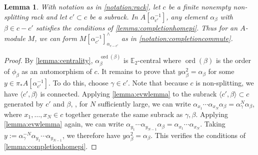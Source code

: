 \documentclass[12 pt]{amsart}
\theoremstyle{plain}
\newtheorem{lemma}[theorem]{Lemma}
\theoremstyle{definition}
\theoremstyle{remark}
\numberwithin{equation}{section}
\newcommand\EE{\mathbb{E}}
\DeclareMathOperator\ord{ord}
\begin{document}
\begin{lemma}\label{lemma:completionhomepihur}
	With notation as in \autoref{notation:rack}, let $c$ be a finite nonempty
	non-splitting rack
	and let $c' \subset c$ be a subrack. In
	$A[\alpha_{c'}^{-1}]$, any element $\alpha_{\beta}$ with $\beta \in c-c'$ satisfies the conditions of \autoref{lemma:completionhomepi}. 
	Thus for an $A$-module $M$, we can form
	$M[\alpha_{c'}^{-1}]^{\wedge}_{\alpha_{c-c'}}$ as in \autoref{notation:completioncommute}.
\end{lemma}
\begin{proof}
	By \autoref{lemma:centrality}, $\alpha_{\beta}^{\ord(\beta)}$ is $\EE_2$-central where $\ord(\beta)$ is the order of $\phi_{\beta}$ as an automorphism of $c$. It remains to prove that
	$y\alpha_{\beta}^2=\alpha_{\beta}$ for some $y \in \pi_*A[\alpha_{c'}^{-1}]$.
	To do this, choose $\gamma\in c'$. 
	Note that because $c$ is non-splitting, we have $\langle c', \beta
	\rangle$ is connected.
	Applying \autoref{lemma:evwlemma} to the subrack
	$\langle c', \beta \rangle \subset c$ generated by $c'$ and $\beta$,
	, %
	for $N$
	sufficiently large, 
	we can write $
\alpha_{x_1}
	\cdots \alpha_{x_N}\alpha_{\beta} =
	\alpha_\gamma^N\alpha_\beta$,
	where $x_1, \ldots, x_N \in c$ together generate the same
	subrack as $\gamma, \beta$.
	Applying \autoref{lemma:evwlemma} 
again, we can write
	$\alpha_{y_1} \cdots
	\alpha_{y_{N-1}}\alpha_{\beta} =\alpha_{x_1} \cdots \alpha_{x_N}$.
	Taking $y := \alpha_\gamma^{-N} \alpha_{y_1} \cdots \alpha_{y_{N-1}}$, we therefore have
	$y\alpha_\beta^2 = \alpha_\beta$. This verifies the conditions of
	\autoref{lemma:completionhomepi}.
	\end{proof}
\end{document}
